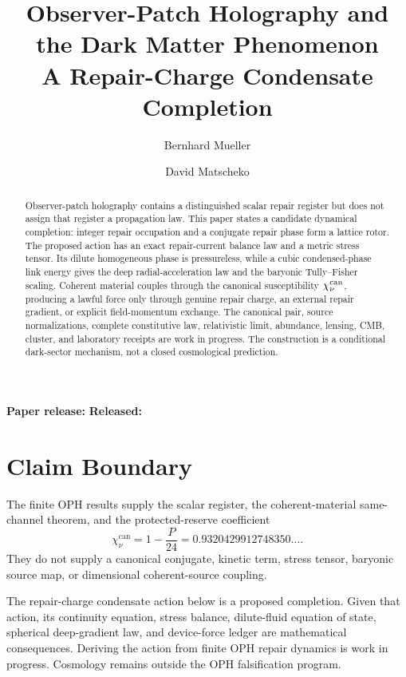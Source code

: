 \documentclass[11pt]{article}
\title{Observer-Patch Holography and the Dark Matter Phenomenon\\
\large A Repair-Charge Condensate Completion}
\author{Bernhard Mueller \and David Matscheko}
\date{\OPHPaperReleaseDate}
\newcommand{\chican}{\chi_\nu^{\mathrm{can}}}
\begin{document}
\maketitle
\begin{center}
\small\textbf{Paper release:} \OPHPaperReleaseID\quad
\textbf{Released:} \OPHPaperReleaseDate
\end{center}

\begin{abstract}
Observer-patch holography contains a distinguished scalar repair register but
does not assign that register a propagation law. This paper states a candidate
dynamical completion: integer repair occupation and a conjugate repair phase
form a lattice rotor. The proposed action has an exact repair-current balance
law and a metric stress tensor. Its dilute homogeneous phase is pressureless,
while a cubic condensed-phase link energy gives the deep radial-acceleration
law and the baryonic Tully--Fisher scaling. Coherent material couples through
the canonical susceptibility \(\chi_\nu^{\rm can}\), producing a lawful force
only through genuine repair charge, an external repair gradient, or explicit
field-momentum exchange. The canonical pair, source normalizations, complete
constitutive law, relativistic limit, abundance, lensing, CMB, cluster, and
laboratory receipts are work in progress. The construction is a conditional
dark-sector mechanism, not a closed cosmological prediction.
\end{abstract}

\section*{Claim Boundary}

The finite OPH results supply the scalar register, the coherent-material
same-channel theorem, and the protected-reserve coefficient
\begin{equation}
\chican=1-\frac{P}{24}=0.9320429912748350\ldots .
\label{eq:chi-value}
\end{equation}
They do not supply a canonical conjugate, kinetic term, stress tensor, baryonic
source map, or dimensional coherent-source coupling.

The repair-charge condensate action below is a proposed completion. Given that
action, its continuity equation, stress balance, dilute-fluid equation of
state, spherical deep-gradient law, and device-force ledger are mathematical
consequences. Deriving the action from finite OPH repair dynamics is work in
progress. Cosmology remains outside the OPH falsification program.
\end{document}
